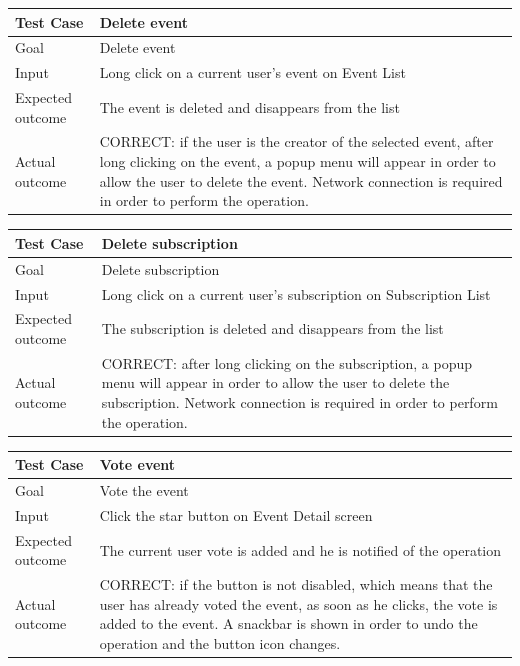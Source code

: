 \documentclass[a4paper]{scrreprt}
\begin{document}
\bigskip
\noindent
\begin{tabularx}{\linewidth}{|l|X|}
	\hline
	\textbf{Test Case} 	& \textbf{Delete event} \\ \hline
	Goal 				& Delete event \\ \hline
	Input 				& Long click on a current user's event on Event List \\ \hline
	Expected outcome 	& The event is deleted and disappears from the list \\ \hline
	Actual outcome 		& CORRECT: if the user is the creator of the selected event, after long clicking on the event, a popup menu will appear in order to allow the user to delete the event. Network connection is required in order to perform the operation. \\ \hline
\end{tabularx}
\bigskip
\noindent
\begin{tabularx}{\linewidth}{|l|X|}
	\hline
	\textbf{Test Case} 	& \textbf{Delete subscription} \\ \hline
	Goal 				& Delete subscription \\ \hline
	Input 				& Long click on a current user's subscription on Subscription List \\ \hline
	Expected outcome 	& The subscription is deleted and disappears from the list \\ \hline
	Actual outcome 		& CORRECT: after long clicking on the subscription, a popup menu will appear in order to allow the user to delete the subscription. Network connection is required in order to perform the operation. \\ \hline
\end{tabularx}
\bigskip
\noindent
\begin{tabularx}{\linewidth}{|l|X|}
	\hline
	\textbf{Test Case} 	& \textbf{Vote event} \\ \hline
	Goal 				& Vote the event \\ \hline
	Input 				& Click the star button on Event Detail screen \\ \hline
	Expected outcome 	& The current user vote is added and he is notified of the operation \\ \hline
	Actual outcome 		& CORRECT: if the button is not disabled, which means that the user has already voted the event, as soon as he clicks, the vote is added to the event. A snackbar is shown in order to undo the operation and the button icon changes. \\ \hline
\end{tabularx}
\end{document}
